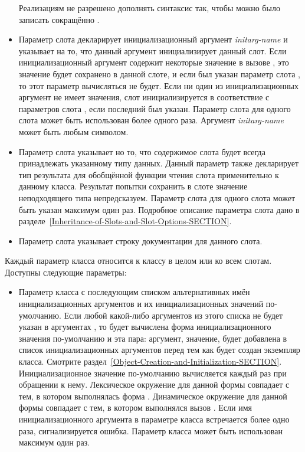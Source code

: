 \begin{defmac}
\begin{itemize}
Реализациям не разрешено дополнять синтаксис  так, чтобы
 можно было записать сокращённо
.

\item 
Параметр слота  декларирует инициализационный аргумент
\emph{initarg-name} и указывает на то, что данный аргумент инициализирует данный
слот. Если инициализационный аргумент содержит некоторые значение в вызове
, это значение будет сохранено в данной слоте, и если
был указан параметр слота , то этот параметр вычисляться не
будет. Если ни один из инициализационных аргумент не имеет значения, слот
инициализируется в соответствие с параметров слота , если
последний был указан. Параметр слота  для одного слота может быть
использован более одного раза. Аргумент \emph{initarg-name} может быть любым
символом.

\item 
Параметр слота  указывает но то, что содержимое слота будет всегда
принадлежать указанному типу данных. Данный параметр также декларирует тип
результата для обобщённой функции чтения слота применительно к данному
класса. Результат попытки сохранить в слоте значение неподходящего типа
непредсказуем. Параметр слота  для одного слота может быть указан
максимум один раз. Подробное описание параметра слота  дано в
разделе~\ref{Inheritance-of-Slots-and-Slot-Options-SECTION}.

\item 
Параметр слота  указывает строку документации для данного
слота.
\end{itemize}

Каждый параметр класса относится к классу в целом или ко всем слотам. Доступны
следующие параметры:

\begin{itemize}

\item 
Параметр класса  с последующим списком альтернативных имён
инициализационных аргументов и их инициализационных значений по-умолчанию.
Если любой какой-либо аргументов из этого списка не будет указан в
аргументах , то будет вычислена форма инициализационного
значения по-умолчанию и эта пара: аргумент, значение, будет добавлена в список
инициализационных аргументов перед тем как будет создан экземпляр
класса. Смотрите
раздел~\ref{Object-Creation-and-Initialization-SECTION}. Инициализационное
значение по-умолчанию вычисляется каждый раз при обращении к нему. Лексическое
окружение для данной формы совпадает с тем, в котором выполнялась форма
. Динамическое окружение для данной формы совпадает с тем, в
котором выполнялся вызов . Если имя инициализационного
аргумента в параметре класса  встречается более одно раза,
сигнализируется ошибка. Параметр класса  может быть
использован максимум один раз.


\end{itemize}
\end{defmac}
